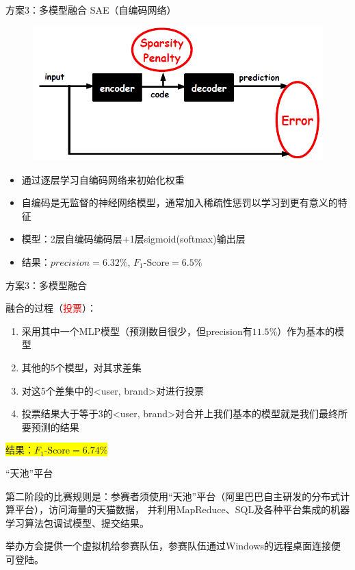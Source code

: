 \documentclass{beamer}
\begin{document}
\begin{frame}{方案3：多模型融合}
SAE（自编码网络）

\begin{figure}
\includegraphics[width=0.5\linewidth]{./SAE}
\end{figure}

\begin{itemize}
\item 通过逐层学习自编码网络来初始化权重
\item 自编码是无监督的神经网络模型，通常加入稀疏性惩罚以学习到更有意义的特征
\item 模型：2层自编码编码层+1层sigmoid(softmax)输出层
\item 结果：$precision = 6.32\%$, $F_1\mbox{-Score} = 6.5\%$
\end{itemize}

\end{frame}

\begin{frame}{方案3：多模型融合}

融合的过程（\textcolor{red}{投票}）：
\begin{enumerate}
\item 采用其中一个MLP模型（预测数目很少，但precision有$11.5\%$）作为基本的模型
\item 其他的5个模型，对其求差集
\item 对这5个差集中的<user, brand>对进行投票
\item 投票结果大于等于3的<user, brand>对合并上我们基本的模型就是我们最终所要预测的结果
\end{enumerate}

\colorbox{yellow}{结果：$F_1\mbox{-Score} = 6.74\%$}

\end{frame}

\begin{frame}{“天池”平台}

第二阶段的比赛规则是：参赛者须使用“天池”平台（阿里巴巴自主研发的分布式计算平台），访问海量的天猫数据，
并利用MapReduce、SQL及各种平台集成的机器学习算法包调试模型、提交结果。 

\vspace{1em}

举办方会提供一个虚拟机给参赛队伍，参赛队伍通过Windows的远程桌面连接便可登陆。

\end{frame}
\end{document}
